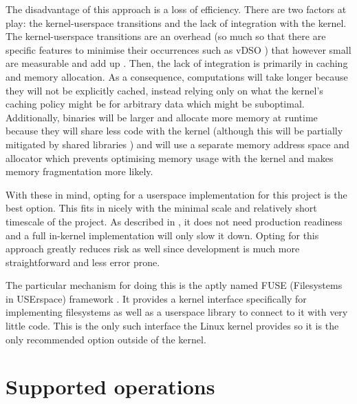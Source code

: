         The disadvantage of this approach is a loss of efficiency. There are
        two factors at play: the kernel-userspace transitions and the lack of
        integration with the kernel. The kernel-userspace transitions are an
        overhead (so much so that there are specific features to minimise their
        occurrences such as vDSO \cite{man_vDSO}) that however small are
        measurable and add up \cite{Linux_context_switch_overhead}. Then, the lack
        of integration is primarily in caching and memory allocation. As a
        consequence, computations will take longer because they will not be
        explicitly cached, instead relying only on what the kernel's caching
        policy might be for arbitrary data which might be suboptimal.
        Additionally, binaries will be larger and allocate more memory at
        runtime because they will share less code with the kernel (although
        this will be partially mitigated by shared libraries
        \cite{shared_libraries}) and will use a separate memory address space
        and allocator which prevents optimising memory usage with the
        kernel and makes memory fragmentation more likely.

        With these in mind, opting for a userspace implementation for this
        project is the best option. This fits in nicely with the minimal scale
        and relatively short timescale of the project. As described in , it does not
        need production readiness and a full in-kernel implementation
        will only slow it down. Opting for this approach greatly reduces
        risk as well since development is much more straightforward and less
        error prone.

        The particular mechanism for doing this is the aptly named FUSE
        (Filesystems in USErspace) framework \cite{FUSE}. It provides a kernel
        interface specifically for implementing filesystems as well as a
        userspace library to connect to it with very little code. This is the
        only such interface the Linux kernel provides so it is the only
        recommended option outside of the kernel.

    \section{Supported operations}
        \label{sec:operations}

